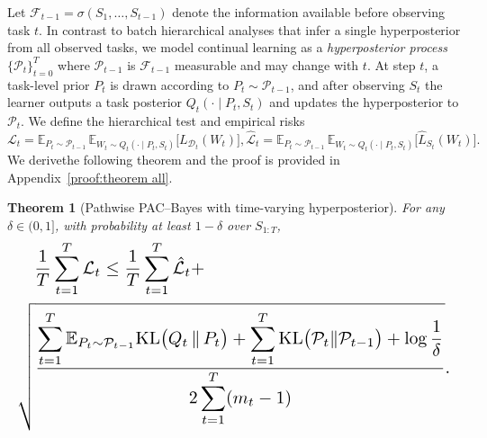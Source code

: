 \documentclass{article}
\theoremstyle{plain}
\newtheorem{theorem}{Theorem}[section]
\theoremstyle{definition}
\theoremstyle{remark}
\begin{document}
Let $\mathcal{F}_{t-1} = \sigma(S_1,\dots,S_{t-1})$ denote the information available before observing task $t$.
In contrast to batch hierarchical analyses that infer a single hyperposterior from all observed tasks, we model continual learning as a \emph{hyperposterior process} $\{\mathcal{P}_t\}_{t=0}^T$ where $\mathcal{P}_{t-1}$ is $\mathcal{F}_{t-1}$ measurable and may change with $t$.
At step $t$, a task-level prior $P_t$ is drawn according to $P_t \sim \mathcal{P}_{t-1}$, and after observing $S_t$ the learner outputs a task posterior $Q_t(\cdot \mid P_t,S_t)$ and updates the hyperposterior to $\mathcal{P}_t$.
We define the hierarchical test and empirical risks
$
\mathcal L_t
=
\mathbb E_{P_t \sim \mathcal{P}_{t-1}}
\,
\mathbb E_{W_t \sim Q_t(\cdot \mid P_t,S_t)}
\big[
L_{\mathcal D_t}(W_t)
\big],
\hat{\mathcal L}_t
=
\mathbb E_{P_t \sim \mathcal{P}_{t-1}}
\,
\mathbb E_{W_t \sim Q_t(\cdot \mid P_t,S_t)}
\big[
\hat L_{S_t}(W_t)
\big].
$
We derivethe following theorem and the proof is provided in Appendix~\ref{proof:theorem all}.
\begin{theorem}[Pathwise PAC--Bayes with time-varying hyperposterior]
\label{thm:pathwise_pac}
For any $\delta\in(0,1]$, with probability at least $1-\delta$ over $S_{1:T}$,
\begin{equation*}
\resizebox{\linewidth}{!}{$
\begin{aligned} 
&\quad\frac{1}{T} \sum_{t=1}^T \mathcal L_t
\le  
\frac{1}{T} \sum_{t=1}^T \hat{\mathcal L}_t  + \\
&
\sqrt{
\frac{
\displaystyle
\sum_{t=1}^T
\mathbb E_{P_t\sim\mathcal P_{t-1}}
\mathrm{KL}\bigl(Q_t \,\Vert\, P_t\bigr)
+
\sum_{t=1}^T
\mathrm{KL}\bigl(\mathcal P_t\Vert\mathcal P_{t-1}\bigr)
+
\log\frac{1}{\delta}}
{2\displaystyle\sum_{t=1}^T (m_t - 1)}
}.
\end{aligned}
$}
\end{equation*}
\end{theorem}
\end{document}
